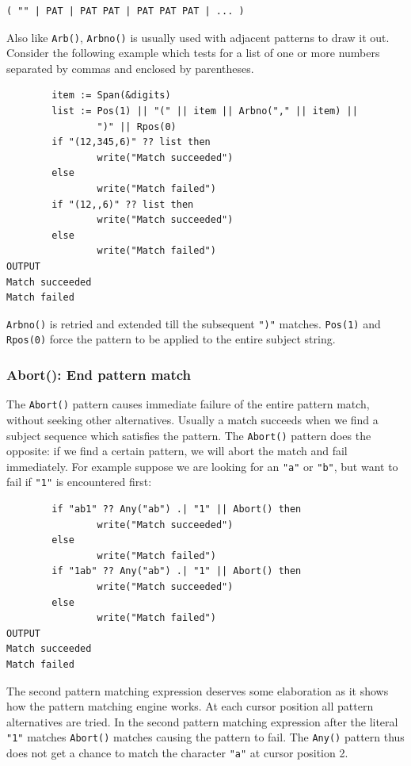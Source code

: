 \documentclass[letterpaper,12pt]{article}
\begin{document}
\begin{verbatim}
( "" | PAT | PAT PAT | PAT PAT PAT | ... )
\end{verbatim}

Also like {\tt Arb()}, {\tt Arbno()} is usually used with adjacent patterns to
draw it out. Consider the following example which tests for a list of
one or more numbers separated by commas and enclosed by parentheses.

\begin{verbatim}
        item := Span(&digits)
        list := Pos(1) || "(" || item || Arbno("," || item) ||
                ")" || Rpos(0)
        if "(12,345,6)" ?? list then
                write("Match succeeded")
        else
                write("Match failed")
        if "(12,,6)" ?? list then
                write("Match succeeded")
        else
                write("Match failed")
OUTPUT
Match succeeded
Match failed
\end{verbatim}

\texttt{Arbno()} is retried and extended till the subsequent \texttt{")"}
matches. {\tt Pos(1)} and {\tt Rpos(0)} force the pattern to be applied to the
entire subject string.

\subsubsection{Abort(): End pattern match}

The {\tt Abort()} pattern causes immediate failure of the entire pattern
match, without seeking other alternatives. Usually a match succeeds
when we find a subject sequence which satisfies the pattern. The
{\tt Abort()} pattern does the opposite: if we find a certain pattern, we
will abort the match and fail immediately.  For example suppose we are
looking for an \texttt{"a"} or \texttt{"b"}, but want to fail if
\texttt{"1"} is encountered first:

\begin{verbatim}
        if "ab1" ?? Any("ab") .| "1" || Abort() then
                write("Match succeeded")
        else
                write("Match failed")
        if "1ab" ?? Any("ab") .| "1" || Abort() then
                write("Match succeeded")
        else
                write("Match failed")
OUTPUT
Match succeeded
Match failed
\end{verbatim}

The second pattern matching expression deserves some elaboration as it
shows how the pattern matching engine works. At each cursor position
all pattern alternatives are tried. In the second pattern matching
expression after the literal {\tt "1"} matches {\tt Abort()} matches causing
the pattern to fail.  The {\tt Any()} pattern thus does not get a chance to
match the character {\tt "a"} at cursor position 2.
\end{document}
